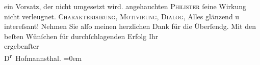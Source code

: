 \begin{ledgroupsized}[t]{13cm}
{{{                  ein Vorsatz, der nicht umgesetzt wird.}}}\label{K_L00050-1h} angehauchten \textsc{Philister} ſeine {\pb}Wirkung nicht verleugnet.
                  \textsc{Charakterisirung}, \textsc{Motivirung},
                  \textsc{Dialog}, Alles glänzend u intereſsant!\pend
           \pstart
           Nehmen Sie alſo meinen herzlichen Dank für die Überſendg.\pend
           \pstart
           Mit den beſten Wünſchen für durchſchlagenden Erfolg Ihr{\\[\baselineskip]}ergebenſter{\\[\baselineskip]}\spacefill\mbox{D\textsuperscript{r} Hofmannsthal.}\pend
           \leftskip=0em{}
         
         \endnumbering{}\end{ledgroupsized}  \newcommand{\dateiname}{L00050}\newcommand{\titel}{Hugo August von Hofmannsthal an Arthur Schnitzler, 7. 12. 1891}\newcommand{\editorInnen}{Martin Anton Müller und Gerd-Hermann Susen}
      